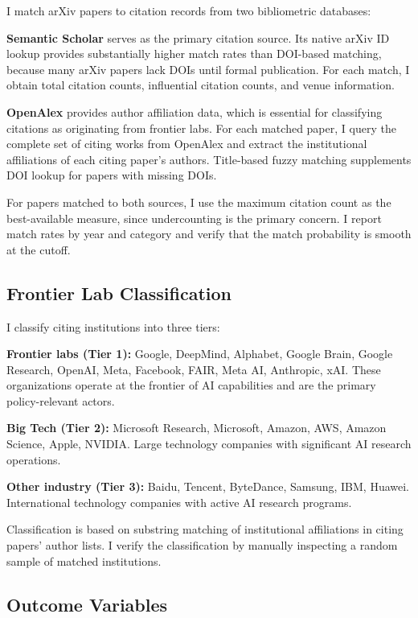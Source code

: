 \documentclass[12pt]{article}
\begin{document}
I match arXiv papers to citation records from two bibliometric databases:

\textbf{Semantic Scholar} serves as the primary citation source. Its native arXiv ID lookup provides substantially higher match rates than DOI-based matching, because many arXiv papers lack DOIs until formal publication. For each match, I obtain total citation counts, influential citation counts, and venue information.

\textbf{OpenAlex} \citep{priem2022} provides author affiliation data, which is essential for classifying citations as originating from frontier labs. For each matched paper, I query the complete set of citing works from OpenAlex and extract the institutional affiliations of each citing paper's authors. Title-based fuzzy matching supplements DOI lookup for papers with missing DOIs.

For papers matched to both sources, I use the maximum citation count as the best-available measure, since undercounting is the primary concern. I report match rates by year and category and verify that the match probability is smooth at the cutoff.

\subsection{Frontier Lab Classification}
\label{sec:frontier_labs}

I classify citing institutions into three tiers:

\textbf{Frontier labs (Tier 1):} Google, DeepMind, Alphabet, Google Brain, Google Research, OpenAI, Meta, Facebook, FAIR, Meta AI, Anthropic, xAI. These organizations operate at the frontier of AI capabilities and are the primary policy-relevant actors.

\textbf{Big Tech (Tier 2):} Microsoft Research, Microsoft, Amazon, AWS, Amazon Science, Apple, NVIDIA. Large technology companies with significant AI research operations.

\textbf{Other industry (Tier 3):} Baidu, Tencent, ByteDance, Samsung, IBM, Huawei. International technology companies with active AI research programs.

Classification is based on substring matching of institutional affiliations in citing papers' author lists. I verify the classification by manually inspecting a random sample of matched institutions.

\subsection{Outcome Variables}
\end{document}
